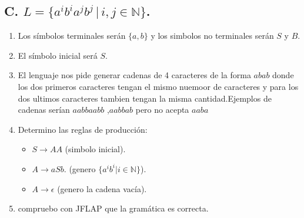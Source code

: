 \documentclass{article}
\begin{document}
        
        \newpage %
        \subsection*{C. $L = \{a^i b^i a^j b^j \, | \, i, j \in \mathbb{N}\}$.}
        \begin{flushleft}
            \begin{enumerate}
                \item Los símbolos terminales serán $\{a,b\}$ y los simbolos no terminales serán $S$ y $B$.
                \item El símbolo inicial será $S$.
                \item El lenguaje nos pide generar cadenas de 4 caracteres de la forma $abab$ donde los dos primeros caracteres tengan 
                el mismo nuemoor de caracteres y para los dos ultimos caracteres tambien tengan la misma cantidad.Ejemplos de cadenas serían $aabbaabb$ ,$aabbab$ pero no acepta $aaba$
                \item Determino las reglas de producción:
                \begin{itemize}
                    \item $S \rightarrow AA$ (simbolo inicial).
                    \item $A \rightarrow aSb$. (genero $\{a^i b^i | i \in \mathbb{N}\}$).
                    \item $A \rightarrow \epsilon$ (genero la cadena vacía).
                \end{itemize}

                \item compruebo con JFLAP que la gramática es correcta.
                


\end{enumerate}
\end{flushleft}
\end{document}
